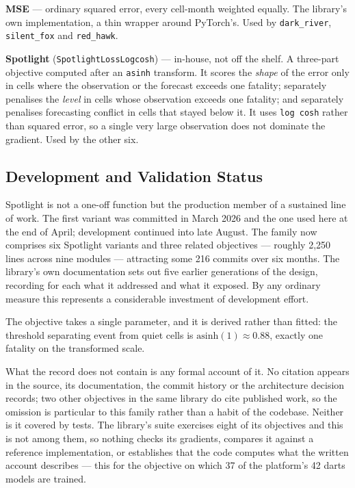 
\textbf{MSE} --- ordinary squared error, every cell-month weighted equally. The library's own
implementation, a thin wrapper around PyTorch's. Used by \texttt{dark\_river}, \texttt{silent\_fox}
and \texttt{red\_hawk}.

\textbf{Spotlight} (\texttt{SpotlightLossLogcosh}) --- in-house, not off the shelf. A three-part
objective computed after an \texttt{asinh} transform. It scores the \textit{shape} of the error only
in cells where the observation or the forecast exceeds one fatality; separately penalises the
\textit{level} in cells whose observation exceeds one fatality; and separately penalises
forecasting conflict in cells that stayed below it. It uses \texttt{log cosh} rather than squared
error, so a single very large observation does not dominate the gradient. Used by the other six.

\subsection*{Development and Validation Status}

Spotlight is not a one-off function but the production member of a sustained line of work. The
first variant was committed in March 2026 and the one used here at the end of April; development
continued into late August. The family now comprises six Spotlight variants and three related
objectives --- roughly 2,250 lines across nine modules --- attracting some 216 commits over six
months. The library's own documentation sets out five earlier generations of the design, recording
for each what it addressed and what it exposed. By any ordinary measure this represents a
considerable investment of development effort.

The objective takes a single parameter, and it is derived rather than fitted: the threshold
separating event from quiet cells is $\mathrm{asinh}(1) \approx 0.88$, exactly one fatality on the
transformed scale.

What the record does not contain is any formal account of it. No citation appears in the source,
its documentation, the commit history or the architecture decision records; two other objectives in
the same library do cite published work, so the omission is particular to this family rather than a
habit of the codebase. Neither is it covered by tests. The library's suite exercises eight of its
objectives and this is not among them, so nothing checks its gradients, compares it against a
reference implementation, or establishes that the code computes what the written account describes
--- this for the objective on which 37 of the platform's 42 darts models are trained.

